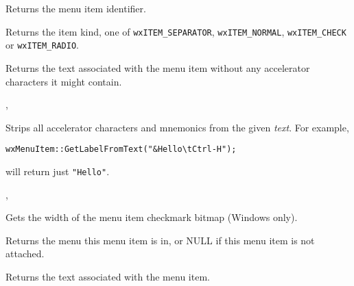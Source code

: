 Returns the menu item identifier.


\label{wxmenuitemgetkind}


Returns the item kind, one of {\tt wxITEM\_SEPARATOR}, {\tt wxITEM\_NORMAL}, 
{\tt wxITEM\_CHECK} or {\tt wxITEM\_RADIO}.


\label{wxmenuitemgetlabel}


Returns the text associated with the menu item without any accelerator
characters it might contain.


, 


\label{wxmenuitemgetlabelfromtext}


Strips all accelerator characters and mnemonics from the given {\it text}.
For example,

\begin{verbatim}
wxMenuItem::GetLabelFromText("&Hello\tCtrl-H");
\end{verbatim}

will return just {\tt "Hello"}.


, 


\label{wxmenuitemgetmarginwidth}


Gets the width of the menu item checkmark bitmap (Windows only).


\label{wxmenuitemgetmenu}


Returns the menu this menu item is in, or NULL if this menu item is not attached.


\label{wxmenuitemgetname}


Returns the text associated with the menu item.

